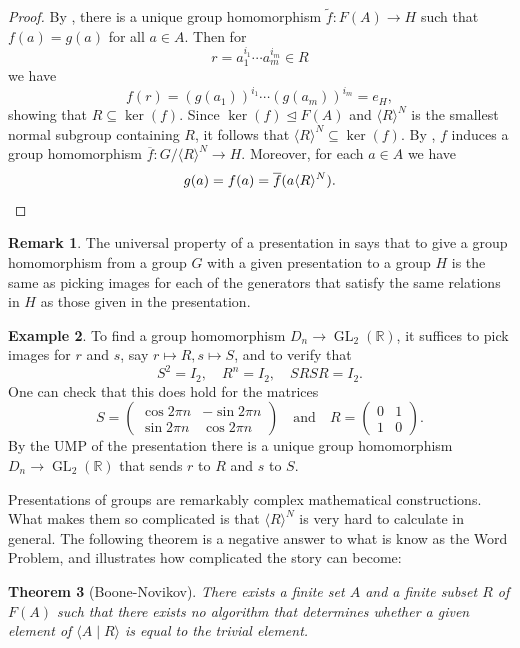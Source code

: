 \documentclass[12pt]{report}
\newtheorem{theorem}{Theorem}[chapter]
\numberwithin{equation}{section}
\numberwithin{theorem}{chapter}
\theoremstyle{definition}
\newtheorem{example}[theorem]{Example}
\newtheorem*{basic properties}{Basic Properties}
\newtheorem*{Important Remark}{Important Remark}
\newtheorem{remark}[theorem]{Remark}
\DeclareMathOperator{\GL}{GL}
\newcommand{\R}{\mathbb{R}}
\renewcommand{\ker}{\operatorname{ker}}
\def\norm{\mathrel{\unlhd}}
\begin{document}
\begin{proof}
By , there is a unique group homomorphism $\tilde f:F(A)\to H$ such that $f(a)=g(a)$ for all $a\in A$. Then for 
$$r = a_1^{i_1} \cdots a_m^{i_m} \in R$$ 
we have 
$$f(r)=(g(a_1))^{i_1} \cdots (g(a_m))^{i_m} = e_H,$$ 
showing that $R\subseteq \ker(f)$. Since $\ker(f)\norm F(A)$ and $\langle R\rangle ^N$ is the smallest normal subgroup containing $R$, it follows that $\langle R\rangle^N\subseteq \ker(f)$. By , $f$ induces a group homomorphism $\overline{f}: G/\langle R\rangle ^N\to H$. Moreover, for each $a\in A$ we have 
$$g(a)=f(a)=\overline f(a\langle R\rangle ^N).\qedhere$$
\end{proof}

\begin{remark}
The universal property of a presentation in  says that to give a group homomorphism from a group $G$ with a given presentation to a group $H$ is the same as picking images for each of the generators that satisfy the same relations in $H$ as those given in the presentation.
\end{remark}

\begin{example}
To find a group homomorphism $D_{n} \to \GL_2(\R)$, it suffices to pick images for $r$ and $s$, say $r\mapsto R, s\mapsto S$, and to verify that 
$$S^2=I_2, \quad R^n=I_2, \quad SRSR=I_2.$$ 
One can check that this does hold for the matrices
$$S=\begin{pmatrix} \cos{2\pi}{n} & -\sin{2\pi}{n} \\ \sin{2\pi}{n} & \cos{2\pi}{n}\end{pmatrix} \quad \textrm{and} \quad R=\begin{pmatrix}  0 & 1 \\ 1& 0\end{pmatrix}.$$
By the UMP of the presentation there is a unique group homomorphism $D_{n} \to \GL_2(\R)$ that sends $r$ to $R$ and $s$ to $S$.
\end{example}


Presentations of groups are remarkably complex mathematical constructions. What makes them so complicated is that $\langle R \rangle^N$ is very hard to calculate in general. The following theorem is a negative answer to what is know as the Word Problem, and illustrates how complicated the story can become:

\begin{theorem}[Boone-Novikov]
There exists a finite set $A$ and a finite subset $R$ of $F(A)$ such that there exists no algorithm that determines whether a given element of $\langle A \mid R \rangle$ is equal to the trivial element.	
\end{theorem}
\end{document}
